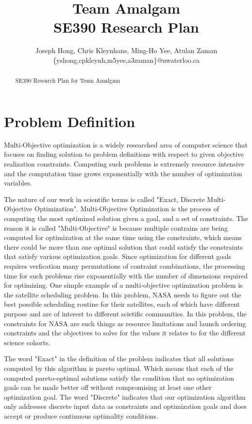 \documentclass[11pt]{article}
\title{{\Large Team Amalgam} \\ SE390 Research Plan}
\author{Joseph Hong, Chris Kleynhans, Ming-Ho Yee, Atulan Zaman \\
        \{yshong,cpkleynh,m5yee,a3zaman\}@uwaterloo.ca}
\begin{document}
\maketitle

\begin{abstract}

SE390 Research Plan for Team Amalgam

\end{abstract}

\tableofcontents
\newpage

\section{Problem Definition}
Multi-Objective optimization is a widely researched area of computer science that focuses on finding solution to problem definitions with respect to given objective realization constraints. Computing such problems is extremely resource intensive and the computation time grows exponentially with the number of optimization variables.

The nature of our work in scientific terms is called "Exact, Discrete Multi-Objective Optimization". Multi-Objective Optimization is the process of computing the most optimized solution given a goal, and a set of constraints. The reason it is called "Multi-Objective" is because multiple contrains are being computed for optimization at the same time using the constraints, which means there could be more than one optimal solution that could satisfy the constraints that satisfy various optimization goals. Since optimization for different goals requires verfication many permutations of contraint combinations, the processing time for such problems rise exponentially with the number of dimensions required for optimizing. One simple example of a multi-objective optimization problem is the satellite scheduling problem. In this problem, NASA needs to figure out the best possible scheduling routine for their satellites, each of which have different purpose and are of interest to different scietific communities. In this problem, the constraints for NASA are such things as resource limitations and launch ordering constraints and the objectives to solve for the values it relates to for the different science cohorts.

The word "Exact" in the definition of the problem indicates that all solutions computed by this algorithm is pareto optimal. Which means that each of the computed pareto-optimal solutions satisfy the condition that no optimization goals can be made better off without compromising at least one other optimization goal. The word "Discrete" indicates that our optimization algorithm only addresses discrete input data as constraints and optimization goals and does accept or produce continuous optimality conditions.
\end{document}
